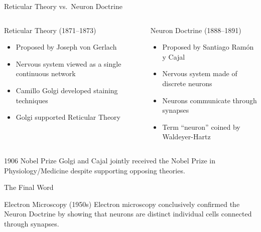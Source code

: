 \documentclass{beamer}
\begin{document}

\begin{frame}{Reticular Theory vs.\ Neuron Doctrine}

\begin{columns}


\begin{block}{Reticular Theory (1871--1873)}
\begin{itemize}
\item Proposed by Joseph von Gerlach
\item Nervous system viewed as a single continuous network
\item Camillo Golgi developed staining techniques
\item Golgi supported Reticular Theory
\end{itemize}
\end{block}


\begin{alertblock}{Neuron Doctrine (1888--1891)}
\begin{itemize}
\item Proposed by Santiago Ramón y Cajal
\item Nervous system made of discrete neurons
\item Neurons communicate through synapses
\item Term ``neuron'' coined by Waldeyer-Hartz
\end{itemize}
\end{alertblock}

\end{columns}

\vspace{0.2cm}

\begin{exampleblock}{1906 Nobel Prize}
Golgi and Cajal jointly received the Nobel Prize in Physiology/Medicine despite supporting opposing theories.
\end{exampleblock}

\end{frame}


\begin{frame}{The Final Word}

\begin{block}{Electron Microscopy (1950s)}
Electron microscopy conclusively confirmed the Neuron Doctrine by showing that neurons are distinct individual cells connected through synapses.
\end{block}

\end{frame}
\end{document}
